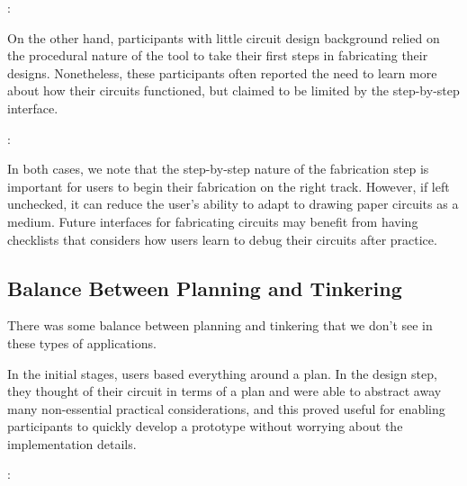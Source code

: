 \documentclass{sigchi}
\begin{document}
  \begin{myquote}
   \vspace{-2pt}
    :
    \vspace{-2pt}
  \end{myquote}

  On the other hand, participants with little circuit design background relied on the procedural nature of the tool to take their first steps in fabricating their designs. Nonetheless, these participants often reported the need to learn more about how their circuits functioned, but claimed to be limited by the step-by-step interface.
  
  \begin{myquote}
   \vspace{-2pt}
    :
    \vspace{-2pt}
  \end{myquote}
  
  In both cases, we note that the step-by-step nature of the fabrication step is important for users to begin their fabrication on the right track. However, if left unchecked, it can reduce the user's ability to adapt to drawing paper circuits as a medium. Future interfaces for fabricating circuits may benefit from having checklists that considers how users learn to debug their circuits after practice.

  \subsection{Balance Between Planning and Tinkering}
  There was some balance between planning and tinkering that we don't see in these types of applications.
  
  In the initial stages, users based everything around a plan. In the design step, they thought of their circuit in terms of a plan and were able to abstract away many non-essential practical considerations, and this proved useful for enabling participants to quickly develop a prototype without worrying about the implementation details.
  
  \begin{myquote}
   \vspace{-2pt}
    :
    \vspace{-2pt}
  \end{myquote}
  
\end{document}
